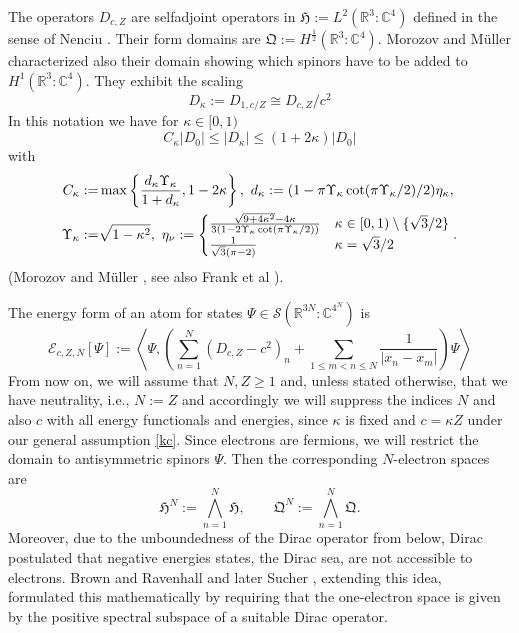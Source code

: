 \documentclass[a4paper]{amsart}
\def\R{\mathbb{R}}
\def\C{{\mathbb C}}
\def\cE{{\mathcal E}}
\def\gH{\mathfrak{H}}
\def\gQ{\mathfrak{Q}}
\def\cz{\mathbb{C}} %
\def\rz{\mathbb{R}} %
\def\atp{\bigwedge\limits} %
\begin{document}
The operators $D_{c,Z}$ are selfadjoint operators in
$\gH:=L^2(\rz^3:\cz^4)$ defined in the sense of Nenciu
\cite{Nenciu1976}. Their form domains are $\gQ:=H^\frac12(\rz^3:\cz^4)$.
Morozov and M\"uller \cite{MorozovMuller2015} characterized also their
domain showing which spinors have to be added to $H^1(\rz^3:\cz^4)$.
They exhibit the scaling
\begin{equation}
  \label{eq:scale}
  D_\kappa:=D_{1,c/Z}\cong D_{c,Z} /c^2
\end{equation}
In this notation we have for $\kappa\in[0,1)$
\begin{equation}
  \label{eq:D-kappa-form}
  C_\kappa|D_0|\leq|D_\kappa|\leq(1+2\kappa) |D_0|
\end{equation}
with
\begin{align}
  \label{5}
  C_\kappa:=& \max\left\{{d_\kappa\Upsilon_\kappa\over1+d_\kappa},1-2\kappa\right\},\
  d_\kappa:= (1-\pi\Upsilon_\kappa\cot(\pi\Upsilon_\kappa/2)/2)\eta_\kappa,\\
  \Upsilon_\kappa:=&\sqrt{1-\kappa^2},\
  \eta_\nu:=
  \begin{cases}
    {\sqrt{9+4\kappa^2}-4\kappa\over3(1-2\Upsilon_\kappa\cot(\pi\Upsilon_\kappa/2))} & \kappa\in[0,1)\setminus\{\sqrt3/2\}\\
    {1\over\sqrt3(\pi-2)} & \kappa=\sqrt3/2
  \end{cases}.
\end{align}
(Morozov and M\"uller \cite[Theorem I.1]{MorozovMuller2017}, see also
Frank et al \cite[Corollary 1.8]{Franketal2021}). 

The energy form of an atom for states
$\Psi\in\mathcal{S}(\R^{3N}:\C^{4^N})$ is
\begin{equation}
  \cE_{c,Z,N}[\Psi]:=\left\langle \Psi,\left(\sum_{n=1}^N (D_{c,Z}-c^2)_n+\sum_{1\leq m<n\leq N}\frac{1}{|x_n-x_m|}\right)\Psi\right\rangle
\end{equation}
From now on, we will assume that $N,Z\geq1$ and, unless stated
otherwise, that we have neutrality, i.e., $N:=Z$ and accordingly we
will suppress the indices $N$ and also $c$ with all energy functionals
and energies, since $\kappa$ is fixed and $c=\kappa Z$ under our
general assumption \eqref{kc}.  Since electrons are fermions, we will
restrict the domain to antisymmetric spinors $\Psi$. Then the
corresponding $N$-electron spaces are
\begin{equation}
  \label{eq:n}
  \gH^N:=\atp_{n=1}^N \gH,\qquad \gQ^N:=\atp_{n=1}^N\gQ.
\end{equation} 
Moreover, due to the unboundedness of the Dirac operator from below,
Dirac postulated that negative energies states, the Dirac sea, are not
accessible to electrons. Brown and Ravenhall \cite{BrownRavenhall1951}
and later Sucher \cite{Sucher1984,Sucher1987}, extending this idea,
formulated this mathematically by requiring that the one-electron
space is given by the positive spectral subspace of a suitable Dirac
operator.
\end{document}
